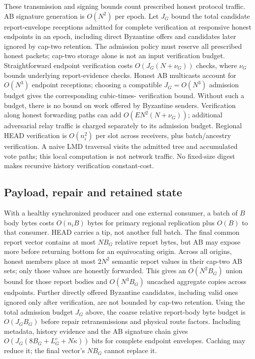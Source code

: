 \documentclass[11pt,a4paper,onecolumn]{article}
\theoremstyle{remark}\newtheorem{example}[definition]{Example}
\newcounter{protocol}
\begin{document}
These transmission and signing bounds count prescribed honest protocol
traffic. AB signature generation is $O(N^2)$ per epoch. Let $J_G$ bound the
total candidate report-envelope receptions admitted for complete verification
at responsive honest endpoints in an epoch, including direct Byzantine offers
and candidates later ignored by cap-two retention. The admission policy must
reserve all prescribed honest packets; cap-two storage alone is not an input
verification budget. Straightforward endpoint verification costs
$O(J_G(N+\nu_G))$ checks, where $\nu_G$ bounds underlying report-evidence
checks. Honest AB multicasts account for $O(N^3)$ endpoint receptions; choosing
a compatible $J_G=O(N^3)$ admission budget gives the corresponding cubic-times-
verification bound. Without such a budget, there is no bound on work offered
by Byzantine senders. Verification along honest forwarding paths can add
$O(EN^2(N+\nu_G))$; additional adversarial relay traffic is charged separately
to its admission budget. Regional HEAD verification is $O(n_i^2)$ per slot across
receivers, plus batch/ancestry verification. A naive LMD traversal visits
the admitted tree and accumulated vote paths; this local computation is not
network traffic. No fixed-size digest makes recursive history verification
constant-cost.

\subsection{Payload, repair and retained state}\label{sec:payloadcost}
With a healthy synchronized producer and one external consumer, a batch of
$B$ body bytes costs $O(n_iB)$ bytes for primary regional replication plus
$O(B)$ to that consumer. HEAD carries a tip, not another full batch.
The final common report vector contains at most $NB_G$ relative report bytes,
but AB may expose more before returning bottom for an equivocating origin.
Across all origins, honest members place at most $2N^2$ semantic report values
in their cap-two AB sets; only those values are honestly forwarded. This gives
an $O(N^2B_G)$ union bound for those report bodies and
$O(N^3B_G)$ uncached aggregate copies across endpoints. Further directly
offered Byzantine candidates, including valid ones ignored only after
verification, are not bounded by cap-two retention. Using the total admission
budget $J_G$ above, the coarse relative report-body byte budget is
$O(J_GB_G)$ before repair retransmissions and physical route factors.
Including metadata, history evidence and the AB signature chain gives
$O(J_G(8B_G+L_G^c+N\kappa))$ bits for complete endpoint envelopes.
Caching may reduce it; the final vector's $NB_G$ cannot replace it.
\end{document}
